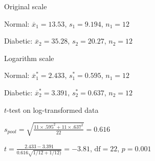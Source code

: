 \bi
 \item Original scale  
  \bi
   \item Normal: $\overline{x}_1 = 13.53$, $s_1 = 9.194$, $n_1 = 12$
   \item Diabetic: $\overline{x}_2 = 35.28$, $s_2 = 20.27$, $n_2 = 12$
  \ei
 \item Logarithm scale
  \bi
   \item Normal: $\overline{x}_1^* = 2.433$, $s_1^* = 0.595$, $n_1 = 12$
   \item Diabetic: $\overline{x}_2^* = 3.391$, $s_2^* = 0.637$, $n_2 = 12$
  \ei
  \item $t$-test on log-transformed data
  \bi
    \item $s_{pool} = \sqrt{\frac{11 \times .595^2 + 11 \times .637^2}{22}} = 0.616$
    \item $t = \frac{2.433-3.391}{0.616\sqrt{1/12 + 1/12)}} = -3.81$, $\textrm{df} = 22$,  $p = 0.001$
  \ei

